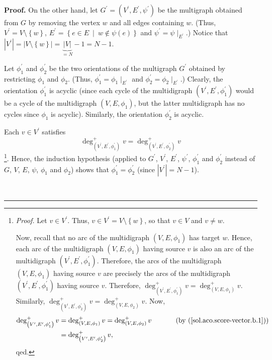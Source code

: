 \documentclass[numbers=enddot,12pt,final,onecolumn,notitlepage]{scrartcl}%
\theoremstyle{definition}
\newenvironment{proof}[1][Proof]{\noindent\textbf{#1.} }{\ \rule{0.5em}{0.5em}}
\begin{document}
\begin{proof}
On the other hand, let $G^{\prime}=\left(  V^{\prime},E^{\prime},\psi^{\prime
}\right)  $ be the multigraph obtained from $G$ by removing the vertex $w$ and
all edges containing $w$. (Thus, $V^{\prime}=V\setminus\left\{  w\right\}  $,
$E^{\prime}=\left\{  e\in E\ \mid\ w\notin\psi\left(  e\right)  \right\}  $
and $\psi^{\prime}=\psi\mid_{E^{\prime}}$.) Notice that $\left\vert V^{\prime
}\right\vert =\left\vert V\setminus\left\{  w\right\}  \right\vert
=\underbrace{\left\vert V\right\vert }_{=N}-1=N-1$.

Let $\phi_{1}^{\prime}$ and $\phi_{2}^{\prime}$ be the two orientations of the
multigraph $G^{\prime}$ obtained by restricting $\phi_{1}$ and $\phi_{2}$.
(Thus, $\phi_{1}^{\prime}=\phi_{1}\mid_{E^{\prime}}$ and $\phi_{2}^{\prime
}=\phi_{2}\mid_{E^{\prime}}$.) Clearly, the orientation $\phi_{1}^{\prime}$ is
acyclic (since each cycle of the multidigraph $\left(  V^{\prime},E^{\prime
},\phi_{1}^{\prime}\right)  $ would be a cycle of the multidigraph $\left(
V,E,\phi_{1}\right)  $, but the latter multidigraph has no cycles since
$\phi_{1}$ is acyclic). Similarly, the orientation $\phi_{2}^{\prime}$ is acyclic.

Each $v\in V^{\prime}$ satisfies%
\[
\deg_{\left(  V^{\prime},E^{\prime},\phi_{1}^{\prime}\right)  }^{+}%
v=\deg_{\left(  V^{\prime},E^{\prime},\phi_{2}^{\prime}\right)  }^{+}v
\]
\footnote{\textit{Proof.} Let $v\in V^{\prime}$. Thus, $v\in V^{\prime
}=V\setminus\left\{  w\right\}  $, so that $v\in V$ and $v\neq w$.
\par
Now, recall that no arc of the multidigraph $\left(  V,E,\phi_{1}\right)  $
has target $w$. Hence, each arc of the multidigraph $\left(  V,E,\phi
_{1}\right)  $ having source $v$ is also an arc of the multidigraph $\left(
V^{\prime},E^{\prime},\phi_{1}^{\prime}\right)  $. Therefore, the arcs of the
multidigraph $\left(  V,E,\phi_{1}\right)  $ having source $v$ are precisely
the arcs of the multidigraph $\left(  V^{\prime},E^{\prime},\phi_{1}^{\prime
}\right)  $ having source $v$. Therefore, $\deg_{\left(  V^{\prime},E^{\prime
},\phi_{1}^{\prime}\right)  }^{+}v=\deg_{\left(  V,E,\phi_{1}\right)  }^{+}v$.
Similarly, $\deg_{\left(  V^{\prime},E^{\prime},\phi_{2}^{\prime}\right)
}^{+}v=\deg_{\left(  V,E,\phi_{2}\right)  }^{+}v$. Now,%
\begin{align*}
\deg_{\left(  V^{\prime},E^{\prime},\phi_{1}^{\prime}\right)  }^{+}v  &
=\deg_{\left(  V,E,\phi_{1}\right)  }^{+}v=\deg_{\left(  V,E,\phi_{2}\right)
}^{+}v\ \ \ \ \ \ \ \ \ \ \left(  \text{by (\ref{sol.aco.score-vector.b.1}%
)}\right) \\
&  =\deg_{\left(  V^{\prime},E^{\prime},\phi_{2}^{\prime}\right)  }^{+}v,
\end{align*}
qed.}. Hence, the induction hypothesis (applied to $G^{\prime}$, $V^{\prime}$,
$E^{\prime}$, $\psi^{\prime}$, $\phi_{1}^{\prime}$ and $\phi_{2}^{\prime}$
instead of $G$, $V$, $E$, $\psi$, $\phi_{1}$ and $\phi_{2}$) shows that
$\phi_{1}^{\prime}=\phi_{2}^{\prime}$ (since $\left\vert V^{\prime}\right\vert
=N-1$).


\end{proof}
\end{document}
